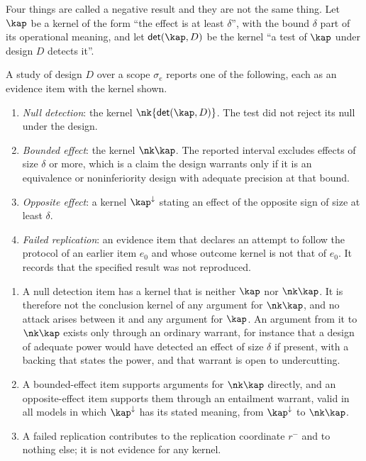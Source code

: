 Four things are called a negative result and they are not the same thing. Let $\kap$ be a kernel of the form ``the effect is at least $\delta$'', with the bound $\delta$ part of its operational meaning, and let $\mathsf{det}(\kap,D)$ be the kernel ``a test of $\kap$ under design $D$ detects it''.

\begin{definition}\label{def:negoutcomes}
A study of design $D$ over a scope $\sigma_e$ reports one of the following, each as an evidence item with the kernel shown.
\begin{enumerate}[label=(\roman*)]
\item \emph{Null detection}: the kernel $\nk{\mathsf{det}(\kap,D)}$. The test did not reject its null under the design.
\item \emph{Bounded effect}: the kernel $\nk\kap$. The reported interval excludes effects of size $\delta$ or more, which is a claim the design warrants only if it is an equivalence or noninferiority design with adequate precision at that bound.
\item \emph{Opposite effect}: a kernel $\kap^{\downarrow}$ stating an effect of the opposite sign of size at least $\delta$.
\item \emph{Failed replication}: an evidence item that declares an attempt to follow the protocol of an earlier item $e_0$ and whose outcome kernel is not that of $e_0$. It records that the specified result was not reproduced.
\end{enumerate}
\end{definition}

\begin{proposition}\label{prop:negsupport}
\begin{enumerate}[label=(\alph*)]
\item A null detection item has a kernel that is neither $\kap$ nor $\nk\kap$. It is therefore not the conclusion kernel of any argument for $\nk\kap$, and no attack arises between it and any argument for $\kap$. An argument from it to $\nk\kap$ exists only through an ordinary warrant, for instance that a design of adequate power would have detected an effect of size $\delta$ if present, with a backing that states the power, and that warrant is open to undercutting.
\item A bounded-effect item supports arguments for $\nk\kap$ directly, and an opposite-effect item supports them through an entailment warrant, valid in all models in which $\kap^{\downarrow}$ has its stated meaning, from $\kap^{\downarrow}$ to $\nk\kap$.
\item A failed replication contributes to the replication coordinate $r^-$ and to nothing else; it is not evidence for any kernel.
\end{enumerate}
\end{proposition}

